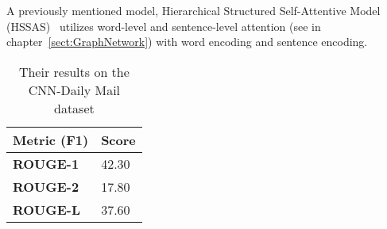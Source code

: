 A previously mentioned model, Hierarchical Structured Self-Attentive Model (HSSAS)~\cite{HSSAS} utilizes word-level and sentence-level attention (see in chapter~\ref{sect:GraphNetwork}) with word encoding and sentence encoding.
\begin{table}[!ht]
	\centering
	\begin{tabular}{| l | l |}
		\hline 
		\textbf{Metric (F1)}&\textbf{Score} \\ \hline \hline
		\textbf{ROUGE-1}&42.30 \\ \hline
		\textbf{ROUGE-2}&17.80 \\ \hline
		\textbf{ROUGE-L}&37.60 \\ \hline
	\end{tabular}
	\caption{Their results on the CNN-Daily Mail dataset}
\end{table}